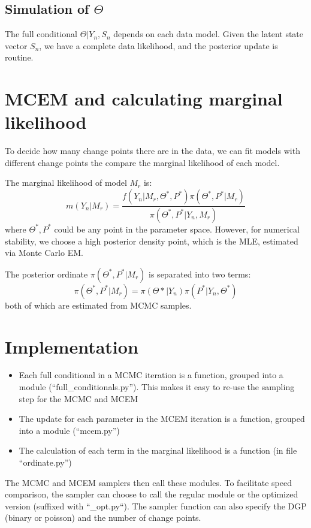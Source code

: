 \documentclass{article}
\begin{document}
    \subsection{Simulation of $\Theta$}\label{simulation-of-theta}

The full conditional $\Theta | Y_n, S_n$ depends on each data model.
Given the latent state vector $S_n$, we have a complete data likelihood,
and the posterior update is routine.

    \section{MCEM and calculating marginal
likelihood}\label{mcem-and-calculating-marginal-likelihood}

To decide how many change points there are in the data, we can fit
models with different change points the compare the marginal likelihood
of each model.

The marginal likelihood of model $M_r$ is: \[
m(Y_n | M_r) = \frac{f(Y_n | M_r, \Theta^*, P^*) \pi(\Theta^*, P^* | M_r)}{\pi(\Theta^*, P^* | Y_n, M_r)}
\] where $\Theta^*, P^*$ could be any point in the parameter space.
However, for numerical stability, we choose a high posterior density
point, which is the MLE, estimated via Monte Carlo EM.

The posterior ordinate $\pi(\Theta^*, P^* | M_r)$ is separated into two
terms: \[
\pi(\Theta^*, P^* | M_r) = \pi(\Theta* | Y_n) \pi(P^* | Y_n, \Theta^*)
\] both of which are estimated from MCMC samples.

    \section{Implementation}\label{implementation}

\begin{itemize}
\itemsep1pt\parskip0pt
\item
  Each full conditional in a MCMC iteration is a function, grouped into
  a module (``full\_conditionals.py''). This makes it easy to re-use the
  sampling step for the MCMC and MCEM
\item
  The update for each parameter in the MCEM iteration is a function,
  grouped into a module (``mcem.py'')
\item
  The calculation of each term in the marginal likelihood is a function
  (in file ``ordinate.py'')
\end{itemize}

The MCMC and MCEM samplers then call these modules. To facilitate speed
comparison, the sampler can choose to call the regular module or the
optimized version (suffixed with ``\_opt.py``). The sampler function can
also specify the DGP (binary or poisson) and the number of change
points.
\end{document}
